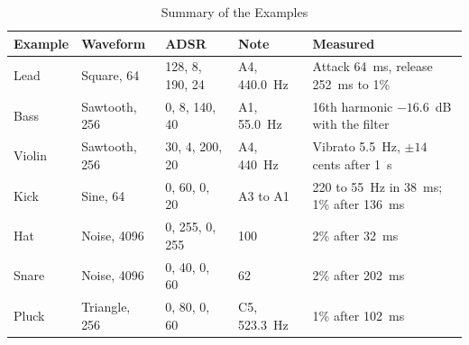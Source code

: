 \begin{table}[H]
	\centering
	\small
	\begin{tabular}{llllp{4.6cm}}
		\toprule
		\textbf{Example} & \textbf{Waveform} & \textbf{ADSR}   & \textbf{Note} & \textbf{Measured}                        \\
		\midrule
		Lead             & Square, 64        & 128, 8, 190, 24 & A4, 440.0~Hz  & Attack 64~ms, release 252~ms to 1\%      \\
		Bass             & Sawtooth, 256     & 0, 8, 140, 40   & A1, 55.0~Hz   & 16th harmonic $-16.6$~dB with the filter \\
		Violin           & Sawtooth, 256     & 30, 4, 200, 20  & A4, 440~Hz    & Vibrato 5.5~Hz, $\pm 14$ cents after 1~s \\
		Kick             & Sine, 64          & 0, 60, 0, 20    & A3 to A1      & 220 to 55~Hz in 38~ms; 1\% after 136~ms  \\
		Hat              & Noise, 4096       & 0, 255, 0, 255  & 100           & 2\% after 32~ms                          \\
		Snare            & Noise, 4096       & 0, 40, 0, 60    & 62            & 2\% after 202~ms                         \\
		Pluck            & Triangle, 256     & 0, 80, 0, 60    & C5, 523.3~Hz  & 1\% after 102~ms                         \\
		\bottomrule
	\end{tabular}
	\caption{Summary of the Examples}
	\label{tab:ex-summary}
\end{table}
